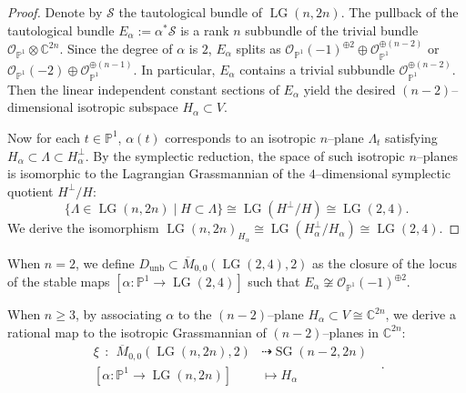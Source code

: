 \documentclass[10pt]{amsart}
\theoremstyle{definition}
\newcommand{\Mbar}{\overline{M}}
\newcommand{\LG}{\operatorname{LG}}
\DeclareMathOperator{\unb}{unb}
\theoremstyle{plain} %
\begin{document}
\begin{proof}
Denote by $\mathcal{S}$ the tautological bundle of $\LG(n,2n)$. The pullback of the tautological bundle $E_\alpha := \alpha^*\mathcal{S}$ is a rank $n$ subbundle of the trivial bundle $\mathcal{O}_{\mathbb{P}^1} \otimes \mathbb{C}^{2n}$. Since the degree of $\alpha$ is $2$, $E_\alpha$ splits as $\mathcal{O}_{\mathbb P^1}(-1)^{\oplus2}\oplus\mathcal{O}_{\mathbb P^1}^{\oplus(n-2)}$ or $\mathcal{O}_{\mathbb P^1}(-2)\oplus\mathcal{O}_{\mathbb P^1}^{\oplus(n-1)}$. In particular,  $E_\alpha$ contains a trivial subbundle $\mathcal{O}_{\mathbb P^1}^{\oplus(n-2)}$. Then the linear independent constant sections of $E_{\alpha}$ yield the desired $(n-2)$--dimensional isotropic subspace $H_{\alpha}\subset V$. 


Now for each $t\in\mathbb P^1$,  $\alpha(t)$ corresponds to an isotropic $n$--plane $\Lambda_t$ satisfying $H_{\alpha} \subset \Lambda \subset H_{\alpha}^\perp$.
By the symplectic reduction, the space of such isotropic $n$--planes is isomorphic to the Lagrangian Grassmannian of the $4$--dimensional symplectic quotient $H^\perp / H$:
\begin{equation}\label{hper}
\{ \Lambda \in \LG(n,2n) \mid H \subset \Lambda \} \cong \LG(H^\perp/H) \cong \LG(2, 4).     
\end{equation}
We derive the isomorphism $\LG(n,2n)_{H_{\alpha}} \cong \LG(H_{\alpha}^\perp/H_{\alpha}) \cong \LG(2,4)$.
\end{proof}


When \(n=2\), we define \(D_{\unb}\subset \overline{M}_{0,0}(\LG(2,4),2)\) as the closure of the locus of the stable maps $[\alpha\colon\mathbb P^1\to \LG(2,4)]$ such that $E_\alpha \not\cong \mathcal{O}_{\mathbb{P}^1}(-1)^{\oplus 2}$. 


When \(n\ge 3\), by associating $\alpha$ to the $(n-2)$--plane
\(H_\alpha\subset V\cong \mathbb{C}^{2n}\),  we derive a rational map to the isotropic Grassmannian of $(n-2)$--planes in $\mathbb C^{2n}$:
\begin{equation}\label{xi}
\begin{split}
\xi\ \ \colon\ \  \Mbar_{0,0}(\LG(n,2n),2) &\dashrightarrow \operatorname{SG}(n-2,2n)\\
[\alpha\colon\mathbb P^1\to \LG(n,2n)]&\mapsto H_{\alpha}   
\end{split}\ \ \ .   
\end{equation}
\end{document}
